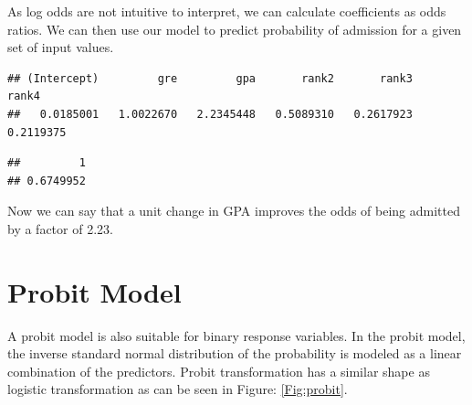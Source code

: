 \documentclass[10pt, letterpaper, twoside]{memoir}\usepackage{knitr}
\begin{document}
As log odds are not intuitive to interpret, we can calculate coefficients as odds ratios. We can then use our model to predict probability of admission for a given set of input values.
\begin{knitrout}
\color{fgcolor}\begin{kframe}
\begin{alltt}
\hlstd{(}
\end{alltt}
\begin{verbatim}
## (Intercept)         gre         gpa       rank2       rank3       rank4 
##   0.0185001   1.0022670   2.2345448   0.5089310   0.2617923   0.2119375
\end{verbatim}
\begin{alltt}
 \hlkwb{<-} \hlstd{(} \hlstd{=} \hlstd{,}  \hlstd{=} \hlstd{,}  \hlstd{=} \hlstd{)}
\hlopt{$} \hlkwb{=} \hlopt{$}
    \hlstd{=} \hlstd{)}
\end{alltt}
\begin{verbatim}
##         1 
## 0.6749952
\end{verbatim}
\end{kframe}
\end{knitrout}

Now we can say that a unit change in GPA improves the odds of being admitted by a factor of 2.23.

\section{Probit Model}

A probit model is also suitable for binary response variables.  In the probit model, the inverse standard normal distribution of the probability is modeled as a linear combination of the predictors. Probit transformation has a similar shape as logistic transformation as can be seen in Figure: \ref{Fig:probit}.
\end{document}
